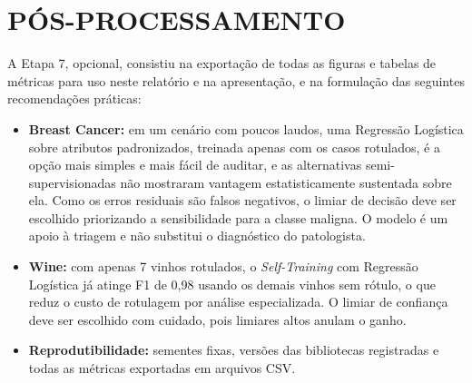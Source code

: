 \section{PÓS-PROCESSAMENTO}

A Etapa 7, opcional, consistiu na exportação de todas as figuras e tabelas de métricas para uso neste relatório e na apresentação, e na formulação das seguintes recomendações práticas:

\begin{itemize}
    \item \textbf{Breast Cancer:} em um cenário com poucos laudos, uma Regressão Logística sobre atributos padronizados, treinada apenas com os casos rotulados, é a opção mais simples e mais fácil de auditar, e as alternativas semi-supervisionadas não mostraram vantagem estatisticamente sustentada sobre ela. Como os erros residuais são falsos negativos, o limiar de decisão deve ser escolhido priorizando a sensibilidade para a classe maligna. O modelo é um apoio à triagem e não substitui o diagnóstico do patologista.
    \item \textbf{Wine:} com apenas 7 vinhos rotulados, o \textit{Self-Training} com Regressão Logística já atinge F1 de 0,98 usando os demais vinhos sem rótulo, o que reduz o custo de rotulagem por análise especializada. O limiar de confiança deve ser escolhido com cuidado, pois limiares altos anulam o ganho.
    \item \textbf{Reprodutibilidade:} sementes fixas, versões das bibliotecas registradas e todas as métricas exportadas em arquivos CSV.
\end{itemize}
